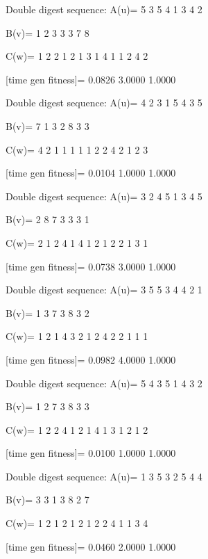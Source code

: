 Double digest sequence:
A(u)=
     5     3     5     4     1     3     4     2

B(v)=
     1     2     3     3     3     7     8

C(w)=
     1     2     2     1     2     1     3     1     4     1     1     2     4     2

[time gen fitness]=
    0.0826    3.0000    1.0000

Double digest sequence:
A(u)=
     4     2     3     1     5     4     3     5

B(v)=
     7     1     3     2     8     3     3

C(w)=
     4     2     1     1     1     1     1     2     2     4     2     1     2     3

[time gen fitness]=
    0.0104    1.0000    1.0000

Double digest sequence:
A(u)=
     3     2     4     5     1     3     4     5

B(v)=
     2     8     7     3     3     3     1

C(w)=
     2     1     2     4     1     4     1     2     1     2     2     1     3     1

[time gen fitness]=
    0.0738    3.0000    1.0000

Double digest sequence:
A(u)=
     3     5     5     3     4     4     2     1

B(v)=
     1     3     7     3     8     3     2

C(w)=
     1     2     1     4     3     2     1     2     4     2     2     1     1     1

[time gen fitness]=
    0.0982    4.0000    1.0000

Double digest sequence:
A(u)=
     5     4     3     5     1     4     3     2

B(v)=
     1     2     7     3     8     3     3

C(w)=
     1     2     2     4     1     2     1     4     1     3     1     2     1     2

[time gen fitness]=
    0.0100    1.0000    1.0000

Double digest sequence:
A(u)=
     1     3     5     3     2     5     4     4

B(v)=
     3     3     1     3     8     2     7

C(w)=
     1     2     1     2     1     2     1     2     2     4     1     1     3     4

[time gen fitness]=
    0.0460    2.0000    1.0000


